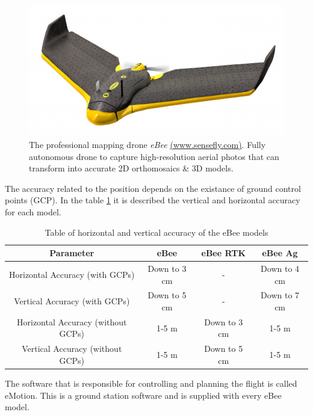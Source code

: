 \begin{figure}[H]
  \centering
  \includegraphics[scale=0.45]{figures/eBee.png}
  \caption[The professional mapping drone eBee]
   {The professional mapping drone \textit{eBee} \href{https://www.sensefly.com/drones/ebee.html}{(www.sensefly.com)}. Fully autonomous drone to capture high-resolution aerial photos that can transform into accurate 2D orthomosaics \& 3D models.}
   \label{fig:ebee}
\end{figure}

The accuracy related to the position depends on the existance of ground control points (GCP). In the table \ref{accuracy} it is described the vertical and horizontal accuracy for each model.

\begin{table}[h!]
	\centering
	\begin{tabular}{|c||c|c|c|}
		\hline
		Parameter & eBee & eBee RTK & eBee Ag\\ \hline\hline
		Horizontal Accuracy (with GCPs) & Down to 3 cm & - & Down to 4 cm\\ \hline
		Vertical Accuracy (with GCPs) & Down to 5 cm & - & Down to 7 cm\\ \hline
		Horizontal Accuracy (without GCPs) & 1-5 m & Down to 3 cm & 1-5 m\\ \hline
		Vertical Accuracy (without GCPs) & 1-5 m & Down to 5 cm & 1-5 m\\ \hline
	\end{tabular}
	\caption{Table of horizontal and vertical accuracy of the eBee models}
	\label{accuracy}
\end{table}

The software that is responsible for controlling and planning the flight is called eMotion. This is a ground station software and is supplied with every eBee model.